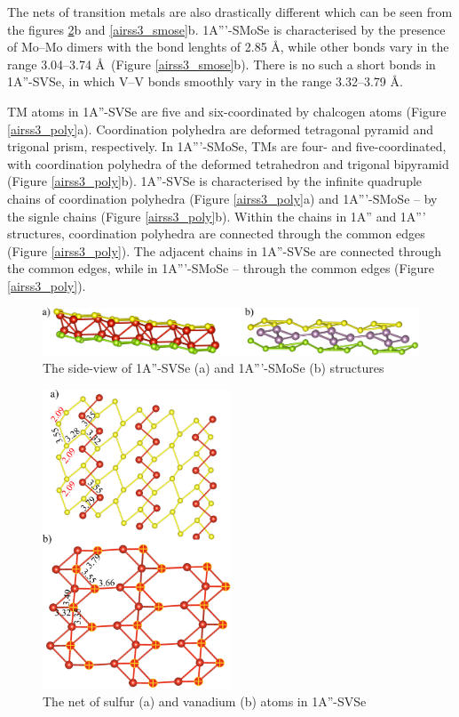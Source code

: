 \documentclass[a4paperm]{article}
\begin{document}
The nets of transition metals are also drastically different which can be seen from the figures \ref{airss3_svse}b and \ref{airss3_smose}b.
1A'''-SMoSe is characterised by the presence of Mo--Mo dimers with the bond lenghts of 2.85 \AA, while other bonds vary in the range 3.04--3.74 \AA\ (Figure \ref{airss3_smose}b).
There is no such a short bonds in 1A''-SVSe, in which V--V bonds smoothly vary in the range 3.32--3.79 \AA.

TM atoms in 1A''-SVSe are five and six-coordinated by chalcogen atoms (Figure \ref{airss3_poly}a).
Coordination polyhedra are  deformed tetragonal pyramid and trigonal prism, respectively.
In 1A'''-SMoSe, TMs are four- and five-coordinated, with coordination polyhedra of the deformed tetrahedron and trigonal bipyramid (Figure \ref{airss3_poly}b).
1A''-SVSe is characterised by the infinite quadruple chains of coordination polyhedra (Figure \ref{airss3_poly}a) and 1A'''-SMoSe -- by the signle chains (Figure \ref{airss3_poly}b).
Within the chains in 1A'' and 1A''' structures, coordination polyhedra are connected through the common edges (Figure \ref{airss3_poly}).
The adjacent chains in 1A''-SVSe are connected through the common edges, while in 1A'''-SMoSe -- through the common edges (Figure \ref{airss3_poly}).

\begin{figure}[H]
	\includegraphics[width=\textwidth]{airss3_side.png}
	\caption{The side-view of 1A''-SVSe (a) and 1A'''-SMoSe (b) structures}
	\label{airss3_side}
\end{figure}

\begin{figure}[H]
	\includegraphics[width=0.5\textwidth]{airss3_svse.png}
	\caption{The net of sulfur (a) and vanadium (b) atoms in 1A''-SVSe}
	\label{airss3_svse}
\end{figure}
\end{document}
